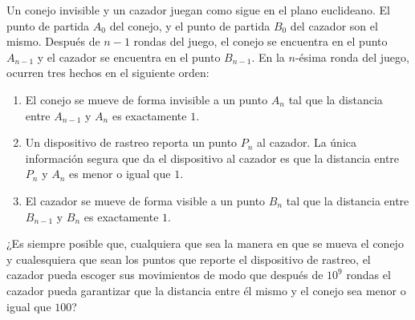 Un conejo invisible y un cazador juegan como sigue en el plano euclideano. El punto de partida $A_0$ del conejo, y el punto de partida $B_0$ del cazador son el mismo. Después de $n-1$ rondas del juego, el conejo se encuentra en el punto $A_{n-1}$ y el cazador se encuentra en el punto $B_{n-1}$. En la $n$-ésima ronda del juego, ocurren tres hechos en el siguiente orden: 
\begin{enumerate}
\item El conejo se mueve de forma invisible a un punto $A_n$ tal que la distancia entre $A_{n-1}$ y $A_n$ es exactamente $1$. 
\item Un dispositivo de rastreo reporta un punto $P_n$ al cazador. La única información segura que da el dispositivo al cazador es que la distancia entre $P_n$ y $A_n$ es menor o igual que $1$. 
\item El cazador se mueve de forma visible a un punto $B_n$ tal que la distancia entre $B_{n-1}$ y $B_n$ es exactamente $1$. 
\end{enumerate}
¿Es siempre posible que, cualquiera que sea la manera en que se mueva el conejo y cualesquiera que sean los puntos que reporte el dispositivo de rastreo, el cazador pueda escoger sus movimientos de modo que después de $10^9$ rondas el cazador pueda garantizar que la distancia entre él mismo y el conejo sea menor o igual que $100$?
